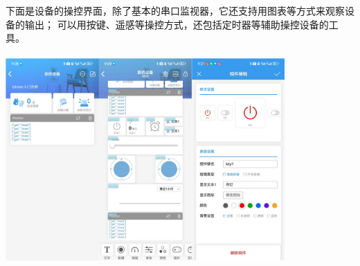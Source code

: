 \documentclass[16pt]{beamer}	%
\begin{document}
	    \begin{frame}
	    	下面是设备的操控界面，除了基本的串口监视器，它还支持用图表等方式来观察设备的输出；
	    	可以用按键、遥感等操控方式，还包括定时器等辅助操控设备的工具。
	    	\\ \hspace*{\fill} \\\centering \includegraphics[width=0.8\textwidth]{pic/4-5.png}
	    \end{frame}	
	    
\end{document}
